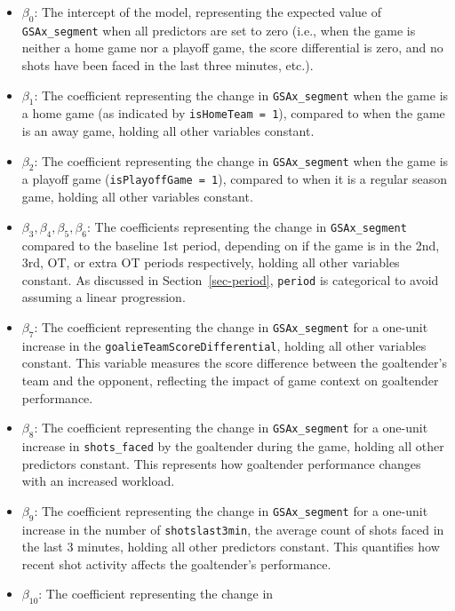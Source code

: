 \documentclass[
  letterpaper,
  DIV=11,
  numbers=noendperiod]{scrartcl}
\begin{document}
\begin{itemize}
\item
  \(\beta_0\): The intercept of the model, representing the expected
  value of \texttt{GSAx\_segment} when all predictors are set to zero
  (i.e., when the game is neither a home game nor a playoff game, the
  score differential is zero, and no shots have been faced in the last
  three minutes, etc.).
\item
  \(\beta_1\): The coefficient representing the change in
  \texttt{GSAx\_segment} when the game is a home game (as indicated by
  \texttt{isHomeTeam\ =\ 1}), compared to when the game is an away game,
  holding all other variables constant.
\item
  \(\beta_2\): The coefficient representing the change in
  \texttt{GSAx\_segment} when the game is a playoff game
  (\texttt{isPlayoffGame\ =\ 1}), compared to when it is a regular
  season game, holding all other variables constant.
\item
  \(\beta_3, \beta_4, \beta_5, \beta_6\): The coefficients representing
  the change in \texttt{GSAx\_segment} compared to the baseline 1st
  period, depending on if the game is in the 2nd, 3rd, OT, or extra OT
  periods respectively, holding all other variables constant. As
  discussed in Section~\ref{sec-period}, \texttt{period} is categorical
  to avoid assuming a linear progression.
\item
  \(\beta_7\): The coefficient representing the change in
  \texttt{GSAx\_segment} for a one-unit increase in the
  \texttt{goalieTeamScoreDifferential}, holding all other variables
  constant. This variable measures the score difference between the
  goaltender's team and the opponent, reflecting the impact of game
  context on goaltender performance.
\item
  \(\beta_8\): The coefficient representing the change in
  \texttt{GSAx\_segment} for a one-unit increase in
  \texttt{shots\_faced} by the goaltender during the game, holding all
  other predictors constant. This represents how goaltender performance
  changes with an increased workload.
\item
  \(\beta_9\): The coefficient representing the change in
  \texttt{GSAx\_segment} for a one-unit increase in the number of
  \texttt{shotslast3min}, the average count of shots faced in the last 3
  minutes, holding all other predictors constant. This quantifies how
  recent shot activity affects the goaltender's performance.
\item
  \(\beta_{10}\): The coefficient representing the change in

\end{itemize}
\end{document}

